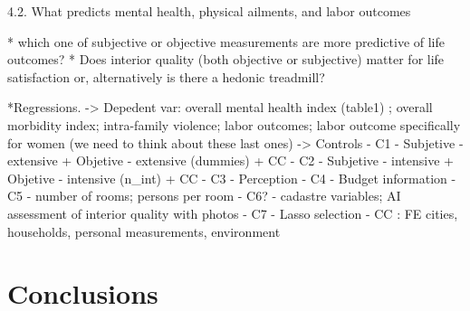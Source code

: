 4.2. What predicts mental health, physical ailments, and labor outcomes

* which one of subjective or objective measurements are more predictive of life outcomes? 
* Does interior quality (both objective or subjective) matter for life satisfaction or, alternatively is there a hedonic treadmill?

*Regressions. 
    -> Depedent var: overall mental health index (table1) ; overall morbidity index; intra-family violence; labor outcomes; labor outcome specifically for women (we need to think about these last ones)
    -> Controls
        - C1 - Subjetive - extensive + Objetive - extensive (dummies) + CC
        - C2 - Subjetive - intensive + Objetive - intensive  (n_int)  + CC
        - C3 - Perception 
        - C4 - Budget information
        - C5 - number of rooms; persons per room
        - C6? - cadastre variables; AI assessment of interior quality with photos
        - C7 - Lasso selection
        - CC : FE cities, households, personal measurements, environment
 

\section{Conclusions}

